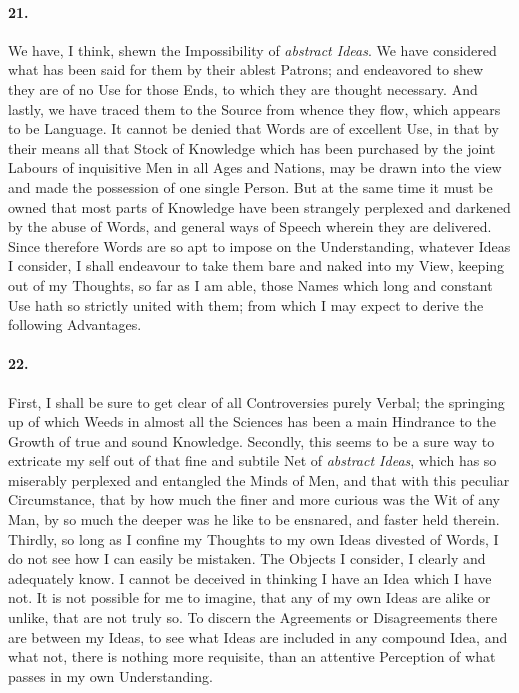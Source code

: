 \documentclass[]{article}
\newenvironment{sectionbody}{\begin{multicols}{2}}{\end{multicols}}
\begin{document}
\begin{sectionbody}
\paragraph{21.} We have, I think, shewn the Impossibility of \emph{abstract
Ideas}.  We have considered what has been said for them by
their ablest Patrons; and endeavored to shew they are of no Use
for those Ends, to which they are thought necessary.  And lastly,
we have traced them to the Source from whence they flow, which
appears to be Language.  It cannot be denied that Words are of
excellent Use, in that by their means all that Stock of Knowledge
which has been purchased by the joint Labours of inquisitive Men
in all Ages and Nations, may be drawn into the view and made the
possession of one single Person.  But at the same time it must be
owned that most parts of Knowledge have been strangely perplexed
and darkened by the abuse of Words, and general ways of Speech
wherein they are delivered.  Since therefore Words are so apt to
impose on the Understanding, whatever Ideas I consider, I shall
endeavour to take them bare and naked into my View, keeping out
of my Thoughts, so far as I am able, those Names which long and
constant Use hath so strictly united with them; from which I may
expect to derive the following Advantages.



\paragraph{22.} First, I shall be sure to get clear of all Controversies purely
Verbal; the springing up of which Weeds in almost all the
Sciences has been a main Hindrance to the Growth of true and
sound Knowledge.  Secondly, this seems to be a sure way to
extricate my self out of that fine and subtile Net of
\emph{abstract Ideas}, which has so miserably perplexed and
entangled the Minds of Men, and that with this peculiar
Circumstance, that by how much the finer and more curious was the
Wit of any Man, by so much the deeper was he like to be
ensnared, and faster held therein. Thirdly, so long as I confine
my Thoughts to my own Ideas divested of Words, I do not see how I
can easily be mistaken.  The Objects I consider, I clearly and
adequately know.  I cannot be deceived in thinking I have an Idea
which I have not.  It is not possible for me to imagine, that any
of my own Ideas are alike or unlike, that are not truly so.  To
discern the Agreements or Disagreements there are between my
Ideas, to see what Ideas are included in any compound Idea, and
what not, there is nothing more requisite, than an attentive
Perception of what passes in my own Understanding.




\end{sectionbody}
\end{document}
